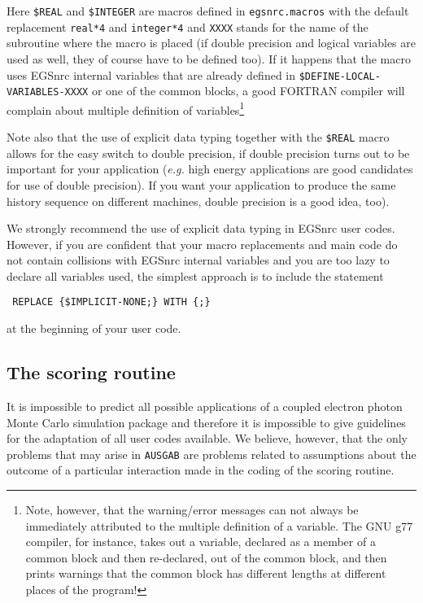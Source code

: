 \noindent
Here {\tt \$REAL} and {\tt \$INTEGER} are macros defined in {\tt egsnrc.macros} 
with the default replacement {\tt real*4} and {\tt integer*4} and 
{\tt XXXX} stands for the name of the subroutine where the macro 
is placed (if 
double precision and logical variables are used as well, they of course 
have to be defined too). If it happens that the macro uses EGSnrc internal 
variables that are already defined in 
{\tt \$DEFINE-LOCAL-VARIABLES-XXXX} or one of the common blocks, 
a good FORTRAN compiler will 
complain about multiple definition of variables\footnote{
Note, however, that the warning/error messages can not 
always be immediately attributed to the multiple definition of 
a variable. The GNU g77 compiler, for instance, takes out 
a variable, declared as a member of a common block and then re-declared,  
out of the common block, and then prints warnings that the 
common block has different lengths at different places of the 
program!}  

Note also that the use of explicit data typing together with the 
{\tt \$REAL} macro allows for the easy switch to double precision,  
if double precision turns out to be important for your 
application ({\em e.g.} high energy applications are good 
candidates for use of double precision). If you want your 
application to produce the same history sequence on different 
machines, double precision is a good idea, too). 

We strongly recommend the use of explicit data typing 
in EGSnrc user codes. However,  if you are confident 
that your macro replacements and main code do not 
contain collisions with EGSnrc internal variables and 
you are too lazy to declare all variables used, the 
simplest approach  is to include the statement 
\begin{flushleft}{\tt
REPLACE \{\$IMPLICIT-NONE;\} WITH \{;\} }
\end{flushleft}

\noindent
at the beginning of your user code.


\subsection{The scoring routine}
\label{scoring}

It is impossible to predict all possible applications of a coupled
electron photon Monte Carlo simulation package and therefore it is
impossible to give guidelines for the adaptation of all user codes
available. We believe, however, that the only problems that may arise
in {\tt AUSGAB} are problems related to assumptions about the outcome
of a particular interaction made in the coding of the scoring routine.

